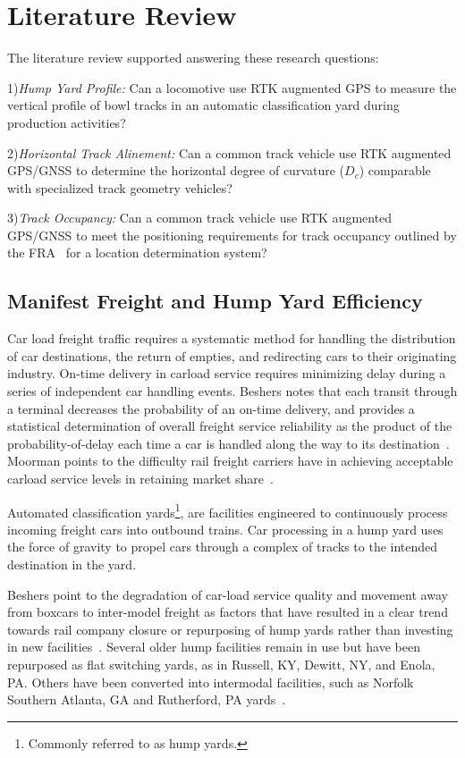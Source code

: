 \chapter{Literature Review}
The literature review supported answering these research questions:

1)\emph{Hump Yard Profile:}
Can a locomotive use RTK augmented GPS to measure the  vertical profile of bowl tracks in an automatic classification yard during production activities?

2)\emph{Horizontal Track Alinement:}
Can a common track vehicle use RTK augmented GPS/GNSS to determine the horizontal degree of curvature ($D_c$) comparable with specialized track geometry vehicles?

3)\emph{Track Occupancy:}
Can a common track vehicle use RTK augmented GPS/GNSS to meet the positioning requirements for track occupancy outlined by the FRA~\citep[pp.6-7]{1995FRADiffe} for a location determination system?

\section{Manifest Freight and Hump Yard Efficiency}
Car load freight traffic requires a systematic method for handling the distribution of car destinations, the return of empties, and redirecting cars to their originating industry. On-time delivery in carload service requires minimizing delay during a series of independent car handling events. Beshers notes that each transit through a terminal decreases the probability of an on-time delivery, and provides a statistical determination of overall freight service reliability as the product of the probability-of-delay each time a car is handled along the way to its destination~\citep{2004beshers}. Moorman points to the difficulty rail freight carriers have in achieving acceptable carload service levels in retaining market share~\citep{2006moorman}.

Automated classification yards\footnote{Commonly referred to as hump yards.}, are facilities engineered to continuously process incoming freight cars into outbound trains. Car processing in a hump yard uses the force of gravity to propel cars through a complex of tracks to the intended destination in the yard.

Beshers point to the degradation of car-load service quality and movement away from boxcars to inter-model freight as factors that have resulted in a clear trend towards rail company closure or repurposing of hump yards rather than investing in new facilities~\citep{2004beshers}. Several older hump facilities remain in use but have been repurposed as flat switching yards, as in Russell, KY, Dewitt, NY, and Enola, PA. Others have been converted into intermodal facilities, such as Norfolk Southern Atlanta, GA and Rutherford, PA yards~\citep{2002HumpTrains}.

